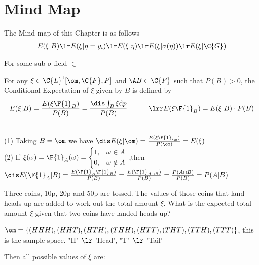 \newcommand{\sg}{\ensuremath{\sigma}}


\section{Mind Map}

The Mind map of this Chapter is as follows
\begin{align}
    E(\xi|B) \lr E(\xi|\eta=y_i) \lr E(\xi|\eta) \lr E(\xi|\sg(\eta)) 
    \lr E(\xi|\C{G}) \notag
\end{align}

\remark For some sub \sg-field  $\in$ 


\begin{definition}
    For any $\xi \in \C{L}^1[\om, \C{F}, P]$ and $\A B\in\C{F}$ such that $P(B)>0$, the 
    Conditional Expectation of $\xi$ given by $B$ is defined by
    \begin{align}
        E(\xi|B) = \frac{E(\xi\F{1}_B)}{P(B)} = \frac{\dis\int_{B}^{}{\xi \mathrm{d}p}}{P(B)}\hspace*{3em}
        \lrr E(\xi\F{1}_B) = E(\xi|B)\cdot P(B)\notag
    \end{align}

    \remark\\
    (1) Taking $B=\om$ we have $\dis E(\xi|\om) = \frac{E(\xi\F{1}_\om)}{P(\om)} = E(\xi)$ \\
    (2) If $\xi(\omega) = \F{1}_A(\omega) = \left\{
    \begin{aligned}
        & 1, & \omega \in A\\
        & 0, & \omega \notin A
    \end{aligned}\right.$
    ,\quad then $\dis E(\F{1}_A|B) = \frac{E(\F{1}_A\F{1}_B)}{P(B)} = \frac{E(\F{1}_{A\cap B})}{P(B)} = \frac{P(A\cap B)}{P(B)} =P(A|B)$
\end{definition} 


Three coins, 10p, 20p and 50p are tossed. The values of those coins that land
heads up are added to work out the total amount $\xi$. What is the expected total
amount $\xi$ given that two coins have landed heads up?


$\om = \{(HHH),(HHT), (HTH),(THH), (HTT), (THT), (TTH), (TTT)\}$, this is the sample space.
"H" $\lr$ 'Head', \qquad "T" $\lr$ 'Tail'

Then all possible values of $\xi$ are:


